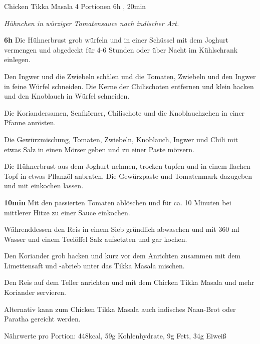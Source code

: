 \documentclass[../recipe-collections/cooking.tex]{subfiles}
\begin{document}
\begin{recipe}{Chicken Tikka Masala} {4 Portionen } {6h , 20min }

  \freeform{}\textit{Hühnchen in würziger Tomatensauce nach indischer Art.}


  \textbf{6h}
  Die Hühnerbrust grob würfeln und in einer Schüssel mit dem Joghurt vermengen und abgedeckt für 4-6 Stunden oder über Nacht im Kühlschrank einlegen.


  Den Ingwer und die Zwiebeln schälen und die Tomaten, Zwiebeln und den Ingwer in feine Würfel schneiden.
  Die Kerne der Chilischoten entfernen und klein hacken und den Knoblauch in Würfel schneiden.


  Die Koriandersamen, Senfkörner, Chilischote und die Knoblauchzehen in einer Pfanne anrösten.


  Die Gewürzmischung, Tomaten, Zwiebeln, Knoblauch, Ingwer und Chili mit etwas Salz in einen Mörser geben und zu einer Paste mörsern.


  Die Hühnerbrust aus dem Joghurt nehmen, trocken tupfen und in einem flachen Topf in etwas Pflanzöl anbraten. Die Gewürzpaste und Tomatenmark dazugeben und mit einkochen lassen.


  \textbf{10min}
  Mit den passierten Tomaten ablöschen und für ca. 10 Minuten bei mittlerer Hitze zu einer Sauce einkochen.


  Währenddessen den Reis in einem Sieb gründlich abwaschen und mit 360 ml Wasser und einem Teelöffel Salz aufsetzten und gar kochen.


  Den Koriander grob hacken und kurz vor dem Anrichten zusammen mit dem Limettensaft und -abrieb unter das Tikka Masala mischen.

  \newstep{}Den Reis auf dem Teller anrichten und mit dem Chicken Tikka Masala und mehr Koriander servieren.

  \freeform{}\hrulefill{}

  \freeform{}
  Alternativ kann zum Chicken Tikka Masala auch indisches Naan-Brot oder Paratha gereicht werden.

  \freeform{}
  Nährwerte pro Portion: 448kcal, 59g Kohlenhydrate, 9g Fett, 34g Eiweiß

\end{recipe}
\end{document}
